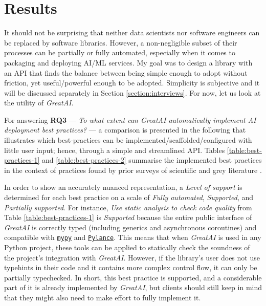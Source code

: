 \chapter{Results} \label{chapter:interviews}

It should not be surprising that neither data scientists nor software engineers can be replaced by software libraries. However, a non-negligible subset of their processes can be partially or fully automated, especially when it comes to packaging and deploying AI/ML services. My goal was to design a library with an API that finds the balance between being simple enough to adopt without friction, yet useful/powerful enough to be adopted. Simplicity is subjective and it will be discussed separately in Section \ref{section:interviews}. For now, let us look at the utility of \textit{GreatAI}.

For answering \textbf{RQ3} --- \textit{To what extent can \textit{GreatAI} automatically implement AI deployment best practices?} --- a comparison is presented in the following that illustrates which best-practices can be implemented/scaffolded/configured with little user input; hence, through a simple and streamlined API. Tables \ref{table:best-practices-1} and \ref{table:best-practices-2} summarise the implemented best practices in the context of practices found by prior surveys of scientific and grey literature \cite{serban2020adoption,serban2021practices,john2020architecting}.

In order to show an accurately nuanced representation, a \textit{Level of support} is determined for each best practice on a scale of \textit{Fully automated}, \textit{Supported}, and \textit{Partially supported}. For instance, \textit{Use static analysis to check code quality} from Table \ref{table:best-practices-1} is \textit{Supported} because the entire public interface of \textit{GreatAI} is correctly typed (including generics and asynchronous coroutines) and compatible with \href{https://mypy.readthedocs.io/en/stable/index.html#}{\texttt{mypy}} and \href{https://marketplace.visualstudio.com/items?itemName=ms-python.vscode-pylance}{\texttt{Pylance}}. This means that when \textit{GreatAI} is used in any Python project, these tools can be applied to statically check the soundness of the project's integration with \textit{GreatAI}. However, if the library's user does not use typehints in their code and it contains more complex control flow, it can only be partially typechecked. In short, this best practice is supported, and a considerable part of it is already implemented by \textit{GreatAI}, but clients should still keep in mind that they might also need to make effort to fully implement it.

